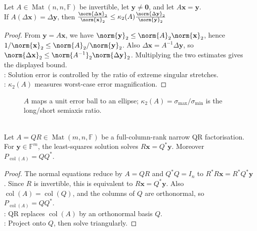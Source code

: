 \begin{theorem} \label{thm:linear-system-relative-error-condition-number} \\
Let $A\in\operatorname{Mat}(n,n,\mathbb{F})$ be invertible, let $\mathbf{y}\neq\mathbf{0}$, and let $A\mathbf{x}=\mathbf{y}$.\\
If $A(\Delta\mathbf{x})=\Delta\mathbf{y}$, then $\frac{\norm{\Delta\mathbf{x}}_2}{\norm{\mathbf{x}}_2} \leq \kappa_2(A)\frac{\norm{\Delta\mathbf{y}}_2}{\norm{\mathbf{y}}_2}$
\begin{proof}
From $\mathbf{y}=A\mathbf{x}$, we have $\norm{\mathbf{y}}_2\leq\norm{A}_2\norm{\mathbf{x}}_2$, hence $1/\norm{\mathbf{x}}_2\leq\norm{A}_2/\norm{\mathbf{y}}_2$. Also $\Delta\mathbf{x}=A^{-1}\Delta\mathbf{y}$, so $\norm{\Delta\mathbf{x}}_2\leq\norm{A^{-1}}_2\norm{\Delta\mathbf{y}}_2$. Multiplying the two estimates gives the displayed bound.\\
: Solution error is controlled by the ratio of extreme singular stretches.\\
: $\kappa_2(A)$ measures worst-case error magnification.
\end{proof}
\end{theorem}

\begin{figure}[H]
  \centering
  
  \caption{$A$ maps a unit error ball to an ellipse; $\kappa_2(A)=\sigma_{\max}/\sigma_{\min}$ is the long/short semiaxis ratio.}
  \label{fig:condition-number-error-bound}
\end{figure}

\begin{proposition} \label{prop:qr-least-squares-and-projection} \\
Let $A=QR\in\operatorname{Mat}(m,n,\mathbb{F})$ be a full-column-rank narrow QR factorisation. For $\mathbf{y}\in\mathbb{F}^m$, the least-squares solution solves $R\mathbf{x}=Q^*\mathbf{y}$. Moreover $P_{\operatorname{col}(A)}=QQ^*$.
\begin{proof}
The normal equations reduce by $A=QR$ and $Q^*Q=I_n$ to $R^*R\mathbf{x}=R^*Q^*\mathbf{y}$.
Since $R$ is invertible, this is equivalent to $R\mathbf{x}=Q^*\mathbf{y}$. Also $\operatorname{col}(A)=\operatorname{col}(Q)$, and the columns of $Q$ are orthonormal, so $P_{\operatorname{col}(A)}=QQ^*$.\\
: QR replaces $\operatorname{col}(A)$ by an orthonormal basis $Q$.\\
: Project onto $Q$, then solve triangularly.
\end{proof}
\end{proposition}

